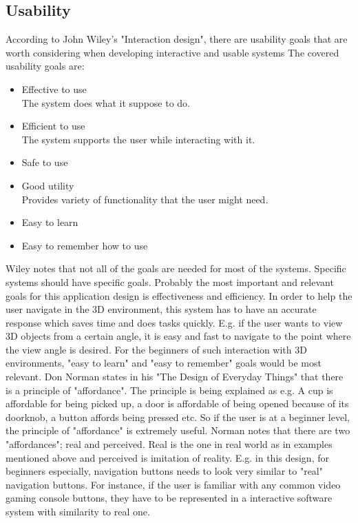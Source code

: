 \subsection{Usability}

According to John Wiley's "Interaction design", there are usability goals that are worth considering when developing interactive and usable systems \cite{Wileys} The covered usability goals are:

\begin{itemize}
\item Effective to use\\
The system does what it suppose to do.
\item Efficient to use\\
The system supports the user while interacting	
with it.
\item Safe to use
\item Good utility \\
Provides variety of functionality that the user might need.
\item Easy to learn
\item Easy to remember how to use
\end{itemize}

Wiley  notes that not all of the goals are needed for most of the systems. Specific systems should have specific goals. Probably the most important and relevant goals for this application design is effectiveness and efficiency. In order to help the user navigate in the 3D environment, this system has to have an accurate response which saves time and does tasks quickly. E.g. if the user wants to view 3D objects from a certain angle, it is easy and fast to navigate to the point where the view angle is desired. For the beginners of such interaction with 3D environments, "easy to learn" and "easy to remember" goals would be most relevant. Don Norman states in his "The Design of Everyday Things" that there is a principle of "affordance". \cite{Normans} The principle is being explained as e.g. A cup is affordable for being picked up, a door is affordable of being opened because of its doorknob, a button affords being pressed etc. So if the user is at a beginner level, the principle of "affordance" is extremely useful. Norman  notes that there are two "affordances"; real and perceived. Real is the one in real world as in examples mentioned above and perceived is imitation of reality. E.g. in this design, for beginners especially, navigation buttons needs to look very similar to "real" navigation buttons. For instance, if the user is familiar with any common video gaming console buttons, they have to be represented in a interactive software system with similarity to real one. 

